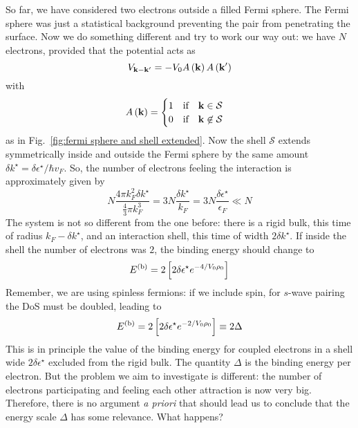 So far, we have considered two electrons outside a filled Fermi sphere. The Fermi sphere was just a statistical background preventing the pair from penetrating the surface. Now we do something different and try to work our way out: we have $N$ electrons, provided that the potential acts as
\[
	V_{\mathbf{k}-\mathbf{k}'} = -V_0 A\left({\mathbf{k}}\right) A\left({\mathbf{k}'}\right)
\]
with
\[
	A\lrR{\mathbf{k}} = \begin{cases}
		1 \qq{if} \mathbf{k} \in \mathcal{S} \\
		0 \qq{if} \mathbf{k} \not\in \mathcal{S}
	\end{cases}
\]
as in Fig.~\ref{fig:fermi sphere and shell extended}. Now the shell $\mathcal{S}$ extends symmetrically inside and outside the Fermi sphere by the same amount $\delta k^\star = \delta \epsilon^\star / \hbar v_F$. So, the number of electrons feeling the interaction is approximately given by
\[
	N \frac{4\pi k_F^2 \delta k^\star}{\displaystyle \frac{4}{3} \pi k_F^3} = 3N \frac{\delta k^\star}{k_F} = 3N \frac{\delta \epsilon^\star}{\epsilon_F} \ll N
\]
The system is not so different from the one before: there is a rigid bulk, this time of radius $k_F - \delta k^\star$, and an interaction shell, this time of width $2 \delta k^\star$. If inside the shell the number of electrons was $2$, the binding energy should change to
\[
	E^{(\mathrm{b})} = 2\left[{2\delta\epsilon^\star e^{-4/V_0 \rho_0}}\right]
\]
Remember, we are using spinless fermions: if we include spin, for $s$-wave pairing the DoS must be doubled, leading to
\[
	E^{(\mathrm{b})} = 2\left[{2\delta\epsilon^\star e^{-2/V_0 \rho_0}}\right] \equiv 2\Delta
\]
This is in principle the value of the binding energy for coupled electrons in a shell wide $2\delta\epsilon^\star$ excluded from the rigid bulk. The quantity $\Delta$ is the binding energy per electron. But the problem we aim to investigate is different: the number of electrons participating and feeling each other attraction is now very big. Therefore, there is no argument \textit{a priori} that should lead us to conclude that the energy scale $\Delta$ has some relevance. What happens?

